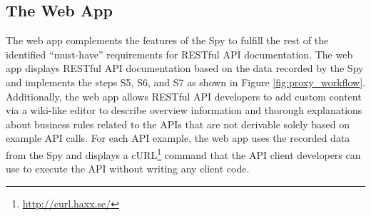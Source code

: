 \documentclass[11pt,oneside]{book}
\begin{document}
\subsection{The Web App}
The web app complements the features of the Spy to fulfill the rest of the identified “must-have” requirements for RESTful API documentation. The web app displays RESTful API documentation based on the data recorded by the Spy and implements the steps S5, S6, and S7 as shown in Figure \ref{fig:proxy_workflow}. Additionally, the web app allows RESTful API developers to add custom content via a wiki-like editor to describe overview information and thorough explanations about business rules related to the APIs that are not derivable solely based on example API calls. For each API example, the web app uses the recorded data from the Spy and displays a cURL\footnote{\url{http://curl.haxx.se/}} command that the API client developers can use to execute the API without writing any client code.
\end{document}
